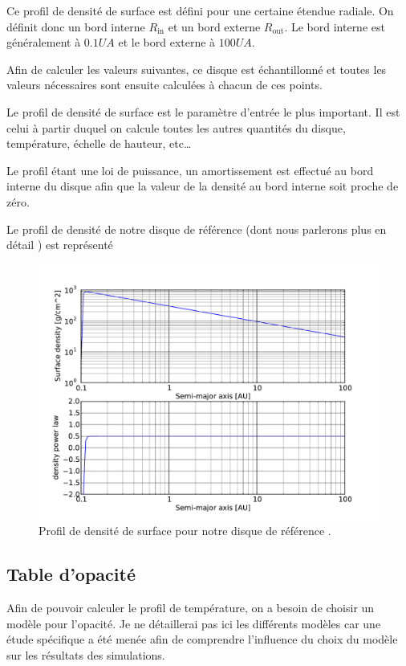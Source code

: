 Ce profil de densité de surface est défini pour une certaine étendue radiale. On définit donc un bord interne $R_\text{in}$ et un bord externe $R_\text{out}$. Le bord interne est généralement à $0.1\unit{UA}$ et le bord externe à $100\unit{UA}$. 

Afin de calculer les valeurs suivantes, ce disque est échantillonné et toutes les valeurs nécessaires sont ensuite calculées à chacun de ces points. 

\bigskip

Le profil de densité de surface est le paramètre d'entrée le plus important. Il est celui à partir duquel on calcule toutes les autres quantités du disque, température, échelle de hauteur, etc\dots

Le profil étant une loi de puissance, un amortissement est effectué au bord interne du disque afin que la valeur de la densité au bord interne soit proche de zéro. 

Le profil de densité de notre disque de référence (dont nous parlerons plus en détail ) est représenté 

\begin{figure}[htbp]
\centering
\includegraphics[width=0.75\linewidth]{figure/fiducial_density_profile.pdf}
\caption{Profil de densité de surface pour notre disque de référence \protect{}.}\label{fig:fiducial_density}
\end{figure}

\subsection{Table d'opacité}
Afin de pouvoir calculer le profil de température, on a besoin de choisir un modèle pour l'opacité. Je ne détaillerai pas ici les différents modèles car une étude spécifique a été menée  afin de comprendre l'influence du choix du modèle sur les résultats des simulations. 

